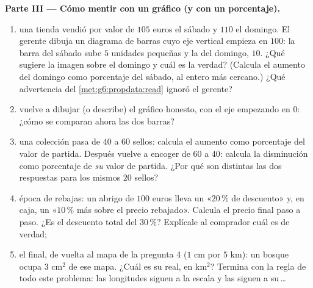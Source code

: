 \begin{problem}
\medskip
\noindent\textbf{Parte III --- Cómo mentir con un gráfico (y con
un porcentaje).}
\begin{enumerate}[resume]
  \item una tienda vendió por valor de $105$ euros el sábado y $110$ el
        domingo. El gerente dibuja un diagrama de barras cuyo eje
        vertical empieza en $100$: la barra del sábado sube $5$ unidades
        pequeñas y la del domingo, $10$. ¿Qué sugiere la imagen
        sobre el domingo y cuál es la verdad? (Calcula
        el aumento del domingo como porcentaje del sábado, al
        entero más cercano.) ¿Qué advertencia del
        \cref{met:g6:propdata:read} ignoró el gerente?
  \item vuelve a dibujar (o describe) el gráfico honesto, con el eje
        empezando en $0$: ¿cómo se comparan ahora las dos barras?
  \item una colección pasa de $40$ a $60$ sellos: calcula el
        aumento como porcentaje del valor de partida. Después vuelve a
        encoger de $60$ a $40$: calcula la disminución como
        porcentaje de \emph{su} valor de partida. ¿Por qué son distintas las
        dos respuestas para los mismos $20$ sellos?
  \item época de rebajas: un abrigo de $100$ euros lleva un «$20\,\%$
        de descuento» y, en caja, un «$10\,\%$ más sobre el
        precio rebajado». Calcula el precio final paso a paso.
        ¿Es el descuento total del $30\,\%$? Explícale al comprador
        cuál es de verdad;
  \item el final, de vuelta al mapa de la pregunta 4 ($1$ cm por
        $5$ km): un bosque ocupa $3$ cm$^2$ de ese mapa. ¿Cuál
        es su  real, en km$^2$? Termina con la regla de
        todo este problema: las longitudes siguen a la escala y las 
        siguen a su\,\dots
\end{enumerate}
\end{problem}

